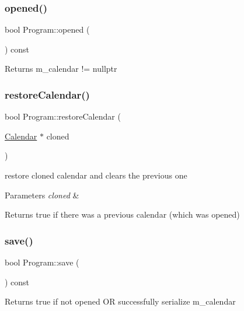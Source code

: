 \subsubsection{\texorpdfstring{opened()}{opened()}}
{\footnotesize\ttfamily bool Program\+::opened (\begin{DoxyParamCaption}{ }\end{DoxyParamCaption}) const}

\begin{DoxyReturn}{Returns}
m\+\_\+calendar != nullptr 
\end{DoxyReturn}
\mbox{\label{classProgram_a0c4c553237a075bc9ab5d4c6b80b4471}} 
\subsubsection{\texorpdfstring{restore\+Calendar()}{restoreCalendar()}}
{\footnotesize\ttfamily bool Program\+::restore\+Calendar (\begin{DoxyParamCaption}\item[{\hyperlink{classCalendar}{Calendar} $\ast$}]{cloned }\end{DoxyParamCaption})}

restore cloned calendar and clears the previous one 
\begin{DoxyParams}{Parameters}
{\em cloned} & \\
\hline
\end{DoxyParams}
\begin{DoxyReturn}{Returns}
true if there was a previous calendar (which was opened) 
\end{DoxyReturn}
\mbox{\label{classProgram_a9ab390cc3caa8cc7dee9704a273a6979}} 
\subsubsection{\texorpdfstring{save()}{save()}}
{\footnotesize\ttfamily bool Program\+::save (\begin{DoxyParamCaption}{ }\end{DoxyParamCaption}) const}

\begin{DoxyReturn}{Returns}
true if not opened OR successfully serialize m\+\_\+calendar 
\end{DoxyReturn}
\mbox{\label{classProgram_a6f703bef529f93987481e04ab6f3014a}} 
